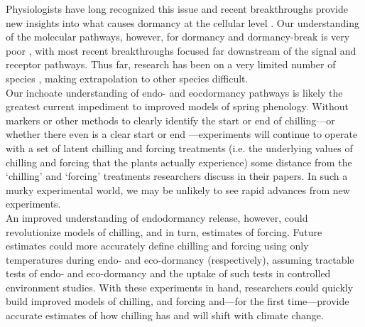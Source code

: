 \documentclass[11pt,letter]{article}
\newcommand{\R}[1]{\label{#1}\linelabel{#1}}
\begin{document}
Physiologists have long recognized this issue and recent breakthroughs provide new insights into what causes dormancy at the cellular level \citep{vanderschoot2014}. \R{r2moredormstart}Our understanding of the molecular pathways, however, for dormancy and dormancy-break is very poor \citep[especially when compared to our understanding of flowering time pathways,][]{Azeez2021}, with most recent breakthroughs  focused far downstream of the signal and receptor pathways. Thus far, research has been on a very limited number of species \citep{Singh:2017,rinne2018}, making extrapolation to other species difficult. \\ %

Our inchoate understanding of endo- and eocdormancy pathways is likely the greatest current impediment to improved models of spring phenology. Without markers or other methods to clearly identify the start or end of chilling---or whether there even is a clear start or end \citep[as opposed to potential parallel models of chilling and forcing,][]{harrington2015}---experiments will continue to operate with a set of latent chilling and forcing treatments (i.e. the underlying values of chilling and forcing that the plants actually experience) some distance from the `chilling' and `forcing' treatments researchers discuss in their papers. In such a murky experimental world, we may be unlikely to see rapid advances from new experiments. \R{r2moredormend}\\

An improved understanding of endodormancy release, however, could revolutionize models of chilling, and in turn, estimates of forcing. Future estimates could more accurately define chilling and forcing using only temperatures during endo- and eco-dormancy (respectively), assuming tractable tests of endo- and eco-dormancy and the uptake of such tests in controlled environment studies. With these experiments in hand, researchers could quickly build improved models of chilling, and forcing and---for the first time---provide accurate estimates of how chilling has and will shift with climate change.\\ %
\end{document}
